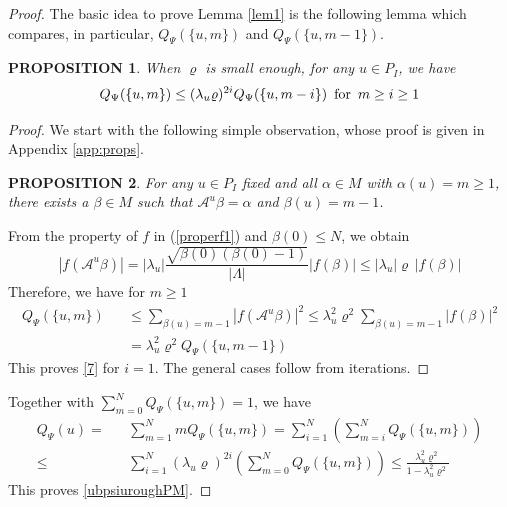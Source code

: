 \documentclass[11pt]{article}
\numberwithin{equation}{section}
\newcommand{\beq}{\begin{equation}}
\newcommand{\eeq}{\end{equation}}
\newcommand{\beqa}{\begin{eqnarray}}
\newcommand{\eeqa}{\end{eqnarray}}
\newcommand\al{{\alpha}}
\newcommand\be{\beta}
\renewcommand\rho\varrho
\newtheorem{prop}{PROPOSITION}[section]
\theoremstyle{definition}
\begin{document}
\begin{proof}  The basic idea to prove Lemma \ref{lem1} is the following lemma which  compares, in particular,
$Q_\Psi(\{u,m\})$ and $Q_\Psi(\{u,m-1\})$.

\begin{prop}\label{prop5}
When $\rho$ is small enough,  for any $u \in P_I$, we have
\beq\label{7}
 Q_\Psi(\{u,m\})\leq (\lambda_u\rho)^{2i} Q_\Psi(\{u,m-i\}){\rm \,\,\,for\,\,\,} m\geq i \ge 1
\eeq
\end{prop}


\begin{proof}
We start with the following simple observation, whose proof is given in Appendix \ref{app:props}.

\begin{prop} \label{prop1}  For any $u \in P_I$ fixed and  all  
$\al\in M$ with $\al(u)=m\ge 1$,  there exists  a $\be\in M$ such that  $\mathcal A^{u}\beta=\al$ and $\be(u)=m-1$. 
\end{prop}



{F}rom the property of $f$ in (\ref{properf1}) and $\be(0)\leq N$,  we obtain 
\[
|f(\mathcal A^{u}\beta)|= |\lambda_u|\frac{\sqrt{\be(0)(\be(0)-1)}}{|\Lambda|}|f(\be)|\leq |\lambda_u|\rho\,|f(\be)|
\]
Therefore,  we have for $m\ge 1$
\beqa\label{ubpsiuroughPM1}
Q_\Psi\left(\{u,m\}\right) &&\leq \sum_{\be(u)=m-1}|f(\mathcal A^{u}\beta)|^2\leq\lambda_u^2\rho^2\sum_{\be(u)=m-1}|f(\be)|^2
\\\nonumber
&&=\lambda_u^2\rho^2 Q_\Psi\left(\{u,m-1\}\right)
\eeqa
This proves \eqref{7} for $i = 1$. The general cases follow from iterations. 


\end{proof}


Together with  $\sum_{m=0}^N Q_\Psi\left(\{u,m\}\right)=1$, we have 
\beqa\label{4}
 Q_\Psi(u)=&&\sum_{m=1}^N m  Q_\Psi(\{u,m\})=\sum_{i=1}^N\left(\sum_{m=i}^N
Q_\Psi\left(\{u,m\}\right)\right)\\\nonumber
\leq &&\sum_{i=1}^N(\lambda_u\rho)^{2i}\left(\sum_{m=0}^N Q_\Psi\left(\{u,m\}\right)\right)\leq\frac{\lambda_u^2\rho^2}{1-\lambda_u^2\rho^2}
\eeqa
This proves  \eqref{ubpsiuroughPM}.





\end{proof}
\end{document}

